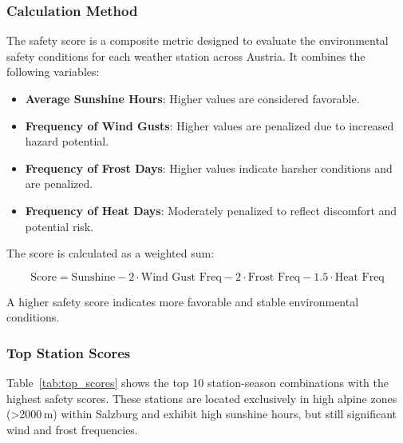\subsubsection{Calculation Method}

The safety score is a composite metric designed to evaluate the environmental safety conditions for each weather station across Austria. It combines the following variables:

\begin{itemize}
    \item \textbf{Average Sunshine Hours}: Higher values are considered favorable.
    \item \textbf{Frequency of Wind Gusts}: Higher values are penalized due to increased hazard potential.
    \item \textbf{Frequency of Frost Days}: Higher values indicate harsher conditions and are penalized.
    \item \textbf{Frequency of Heat Days}: Moderately penalized to reflect discomfort and potential risk.
\end{itemize}

The score is calculated as a weighted sum:

\begin{equation}
\text{Score} = \text{Sunshine} - 2 \cdot \text{Wind Gust Freq} - 2 \cdot \text{Frost Freq} - 1.5 \cdot \text{Heat Freq}
\end{equation}

A higher safety score indicates more favorable and stable environmental conditions.

\subsubsection{Top Station Scores}

Table~\ref{tab:top_scores} shows the top 10 station-season combinations with the highest safety scores. These stations are located exclusively in high alpine zones (\textgreater 2000\,m) within Salzburg and exhibit high sunshine hours, but still significant wind and frost frequencies.

